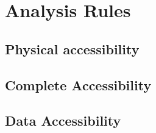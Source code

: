 \documentclass[varwidth=25cm]{article}
\begin{document}





\newpage


\section{Analysis Rules}

\subsection{Physical accessibility}





\subsection{Complete Accessibility}





\subsection{Data Accessibility}
 



\end{document}

